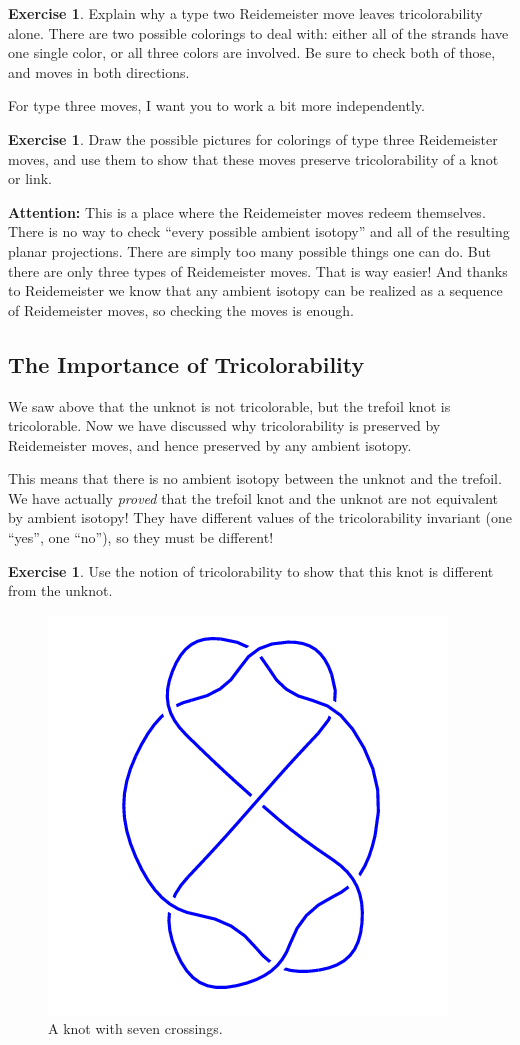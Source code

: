 \documentclass[12pt,letterpaper]{article}
\theoremstyle{definition}
\newtheorem{exercise}[question]{Exercise}
\begin{document}
\begin{exercise}
Explain why a type two Reidemeister move leaves tricolorability alone.
There are two possible colorings to deal with: either all of the strands have one single color, or all three colors are involved.
Be sure to check both of those, and moves in both directions.
\end{exercise}

For type three moves, I want you to work a bit more independently.

\begin{exercise}
Draw the possible pictures for colorings of type three Reidemeister moves, and use them to show that these moves preserve tricolorability of a knot or link.
\end{exercise}

\textbf{Attention:} This is a place where the Reidemeister moves redeem themselves.
There is no way to check ``every possible ambient isotopy'' and all of the resulting planar projections.
There are simply too many possible things one can do.
But there are only three types of Reidemeister moves.
That is way easier!
And thanks to Reidemeister we know that any ambient isotopy can be realized as a sequence of Reidemeister moves, so checking the moves is enough.

\subsection*{The Importance of Tricolorability}

We saw above that the unknot is not tricolorable, but the trefoil knot is tricolorable.
Now we have discussed why tricolorability is preserved by Reidemeister moves, and hence preserved by any ambient isotopy.

This means that there is no ambient isotopy between the unknot and the trefoil.
We have actually \emph{proved} that the trefoil knot and the unknot are not equivalent by ambient isotopy! They have different values of the tricolorability invariant (one ``yes'', one ``no''), so they must be different!


\begin{exercise}
Use the notion of tricolorability to show that this knot is different from the unknot.
\end{exercise}

\begin{figure}[h]
    \centering
    \includegraphics[width=.5\textwidth]{rgp08pics/7_4.png}
    \caption{A knot with seven crossings.}
\end{figure}
\end{document}

